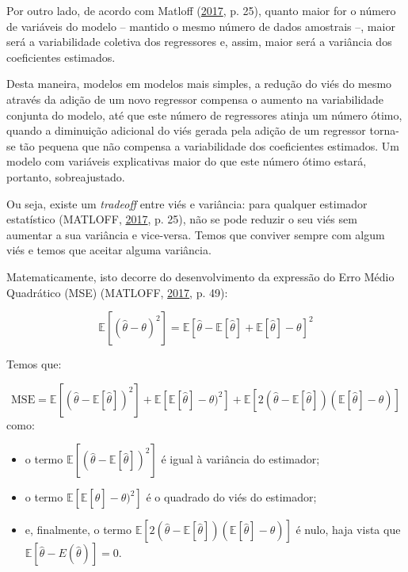 \documentclass[a4paper, 12pt]{article}
\providecommand{\tightlist}{%
  \setlength{\itemsep}{0pt}\setlength{\parskip}{0pt}}
\begin{document}
Por outro lado, de acordo com Matloff
(\protect\hyperlink{ref-matloff2017}{2017}, p. 25), quanto maior for o
número de variáveis do modelo -- mantido o mesmo número de dados
amostrais --, maior será a variabilidade coletiva dos regressores e,
assim, maior será a variância dos coeficientes estimados.

Desta maneira, modelos em modelos mais simples, a redução do viés do
mesmo através da adição de um novo regressor compensa o aumento na
variabilidade conjunta do modelo, até que este número de regressores
atinja um número ótimo, quando a diminuição adicional do viés gerada
pela adição de um regressor torna-se tão pequena que não compensa a
variabilidade dos coeficientes estimados. Um modelo com variáveis
explicativas maior do que este número ótimo estará, portanto,
sobreajustado.

Ou seja, existe um \emph{tradeoff} entre viés e variância: para qualquer
estimador estatístico (MATLOFF,
\protect\hyperlink{ref-matloff2017}{2017}, p. 25), não se pode reduzir o
seu viés sem aumentar a sua variância e vice-versa. Temos que conviver
sempre com algum viés e temos que aceitar alguma variância.

Matematicamente, isto decorre do desenvolvimento da expressão do Erro
Médio Quadrático (MSE) (MATLOFF,
\protect\hyperlink{ref-matloff2017}{2017}, p. 49):

\[\mathbb{E}[(\hat{\theta} - \theta)^2] = \mathbb{E}[\hat{\theta} - \mathbb{E}[\hat{\theta}] + \mathbb{E}[\hat{\theta}] - \theta]^2\]

Temos que:

\[\text{MSE} = \mathbb{E}[(\hat{\theta} - \mathbb{E}[\hat{\theta}])^2] + \mathbb{E}[\mathbb{E}[\hat{\theta}] - \theta)^2] + \mathbb{E}[2(\hat{\theta} - \mathbb{E}[\hat{\theta}])(\mathbb{E}[\hat{\theta}] - \theta)]\]
como:

\begin{itemize}
\tightlist
\item
  o termo \(\mathbb{E}[(\hat{\theta} - \mathbb{E}[\hat{\theta}])^2]\) é
  igual à variância do estimador;
\item
  o termo \(\mathbb{E}[\mathbb{E}[\hat{\theta}] - \theta)^2]\) é o
  quadrado do viés do estimador;
\item
  e, finalmente, o termo
  \(\mathbb{E}[2(\hat{\theta} - \mathbb{E}[\hat{\theta}])(\mathbb{E}[\hat{\theta}] - \theta)]\)
  é nulo, haja vista que
  \(\mathbb{E}[\hat{\theta} - E(\hat{\theta})] = 0\).
\end{itemize}
\end{document}
